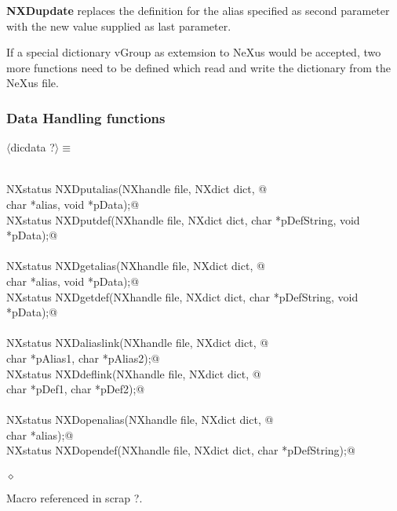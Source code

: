 \documentclass[12pt]{article}
\begin{document}
  {\bf NXDupdate} replaces the definition for the alias specified as second
 parameter with the new value supplied as last parameter.
  
  If a special dictionary vGroup as extemsion to NeXus would be accepted,
  two more functions need to be defined which read and write the dictionary 
  from the NeXus file.

\subsubsection{Data Handling functions}
\begin{flushleft} \small
\begin{minipage}{\linewidth} \label{scrap3}
$\langle$dicdata {\footnotesize ?}$\rangle\equiv$
\vspace{-1ex}
\begin{list}{}{} \item
\mbox{}\verb@@\\
\mbox{}\verb@   NXstatus NXDputalias(NXhandle file, NXdict dict, @\\
\mbox{}\verb@                        char *alias, void *pData);@\\
\mbox{}\verb@   NXstatus NXDputdef(NXhandle file, NXdict dict, char *pDefString, void *pData);@\\
\mbox{}\verb@@\\
\mbox{}\verb@   NXstatus NXDgetalias(NXhandle file, NXdict dict, @\\
\mbox{}\verb@                        char *alias, void *pData);@\\
\mbox{}\verb@   NXstatus NXDgetdef(NXhandle file, NXdict dict, char *pDefString, void *pData);@\\
\mbox{}\verb@@\\
\mbox{}\verb@   NXstatus NXDaliaslink(NXhandle file, NXdict dict, @\\
\mbox{}\verb@                         char *pAlias1, char *pAlias2);@\\
\mbox{}\verb@   NXstatus NXDdeflink(NXhandle file, NXdict dict, @\\
\mbox{}\verb@                         char *pDef1, char *pDef2);@\\
\mbox{}\verb@@\\
\mbox{}\verb@   NXstatus NXDopenalias(NXhandle file, NXdict dict, @\\
\mbox{}\verb@                        char *alias);@\\
\mbox{}\verb@   NXstatus NXDopendef(NXhandle file, NXdict dict, char *pDefString);@\\
\mbox{}\verb@@\\
\mbox{}\verb@@$\diamond$
\end{list}
\vspace{-1ex}
\footnotesize\addtolength{\baselineskip}{-1ex}
\begin{list}{}{\setlength{\itemsep}{-\parsep}\setlength{\itemindent}{-\leftmargin}}
\item Macro referenced in scrap ?.
\end{list}
\end{minipage}\\[4ex]
\end{flushleft}
\end{document}
